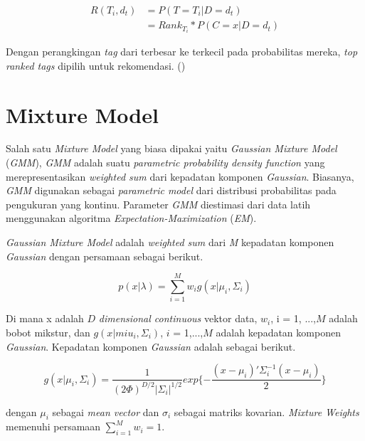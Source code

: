 \begin{equation}
\label{rank_tag}
    \begin{split}
        R(T_{i}, d_{t})
        &= P(T=T_{i}|D=d_{t}) \\
        &= Rank_{T_{i}} * P(C=x|D=d_{t})
    \end{split}
\end{equation}

Dengan perangkingan \textit{tag} dari terbesar ke terkecil pada probabilitas mereka, \textit{top ranked tags} dipilih untuk rekomendasi. (\cite{song2008autotag})

\section{Mixture Model}

Salah satu \textit{Mixture Model} yang  biasa dipakai yaitu \textit{Gaussian Mixture Model} (\textit{GMM}), \textit{GMM} adalah suatu \textit{parametric probability density function} yang merepresentasikan \textit{weighted sum} dari kepadatan komponen \textit{Gaussian}. Biasanya, \textit{GMM} digunakan sebagai \textit{parametric model} dari distribusi probabilitas pada pengukuran yang kontinu. Parameter \textit{GMM} diestimasi dari data latih menggunakan algoritma \textit{Expectation-Maximization} (\textit{EM}).

\textit{Gaussian Mixture Model} adalah \textit{weighted sum} dari \textit{M} kepadatan komponen \textit{Gaussian} dengan persamaan sebagai berikut.

\begin{equation}
    \label{eq:gaussian_mixture_model}
    p(x|\lambda) = \sum_{i=1}^{M} w_i g(x|\mu_i, \Sigma_i)
\end{equation}

Di mana x adalah $D$ \textit{dimensional continuous} vektor data, $w_i$, i = 1, ...,$M$ adalah bobot mikstur, dan $g(x|miu_i, \Sigma_i)$, $i$ = 1,...,$M$ adalah kepadatan komponen \textit{Gaussian}. Kepadatan komponen \textit{Gaussian} adalah sebagai berikut.

\begin{equation}
    \label{eq:component_gaussian_densities}
    g(x|\mu_i, \Sigma_i) = \frac{1}{(2\Phi)^{D/2}|\Sigma_i|^{1/2}}
    exp\{-\frac{(x-\mu_i)'\Sigma_i^{-1}(x-\mu_i)}{2}\}
\end{equation}

dengan $\mu_i$ sebagai \textit{mean vector} dan $\sigma_i$ sebagai matriks kovarian. \textit{Mixture Weights} memenuhi persamaan $\sum_{i=1}^{M}w_i = 1$.

